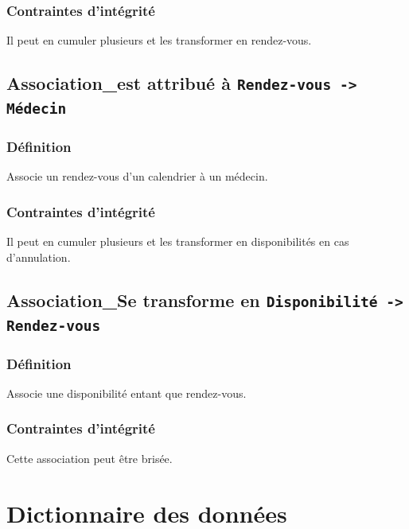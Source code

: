 \documentclass[a4paper, 11pt]{report}
\begin{document}
\subsubsection{Contraintes d'intégrité}
Il peut en cumuler plusieurs et les transformer en rendez-vous.

\subsection{Association\_est attribué à \texttt{Rendez-vous -> Médecin}}
\subsubsection{Définition}
Associe un rendez-vous d'un calendrier à un médecin.
\subsubsection{Contraintes d'intégrité}
Il peut en cumuler plusieurs et les transformer en disponibilités en cas
d'annulation.

\subsection{Association\_Se transforme en \texttt{Disponibilité -> Rendez-vous}}
\subsubsection{Définition}
Associe une disponibilité entant que rendez-vous.
\subsubsection{Contraintes d'intégrité}
Cette association peut être brisée.
\newpage

\section{Dictionnaire des données}
\end{document}
